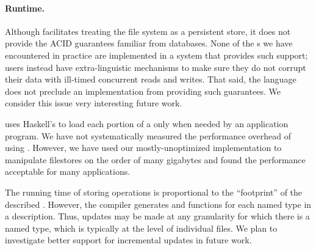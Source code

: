 \paragraph{Runtime.}
Although \forest{} facilitates treating the file system as a
persistent store, it does not provide the ACID guarantees familiar from
databases.  None of the \filestore{}s we
have encountered in practice are implemented in a system that provides
such support; users instead have extra-linguistic mechanisms to make
sure they do not corrupt their data with ill-timed concurrent reads
and writes. That said, the \forest{} language does not preclude an
implementation from providing such guarantees. We consider this issue
very interesting future work. 

\forest{} uses Haskell's  to load each portion
of a \filestore{} only when needed by an application program.
We have not systematically measured the performance overhead of using
\forest{}.  However, we have used our
mostly-unoptimized implementation to manipulate filestores on the
order of many gigabytes and found the performance acceptable
for many applications.  

The running time of storing operations is proportional to the
``footprint'' of the described \filestore{}. However, the \forest{}
compiler generates  and  functions for each
named type in a description. Thus, updates may be made at any
granularity for which there is a named type, which is typically at the
level of individual files. We plan to investigate better support for
incremental updates in future work.



